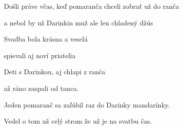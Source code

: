 \begin{song}
\bigskip

Došli práve včas, keď pomaranča chceli zobrať už do ranča\par
a nebol by už Darinkin muž ale len chladený džús\par

\bigskip

Svadba bola krásna a veselá\par
{}spievali aj noví priatelia\par
{}Deti s Darinkou, aj chlapi z ranča\par
až ráno zaspali od tanca. \par

\bigskip

Jeden pomaranč sa zaľúbil raz do Darinky mandarínky.\par
{}Vedel o tom už celý strom že už je na svatbu čas.\par

\end{song}
